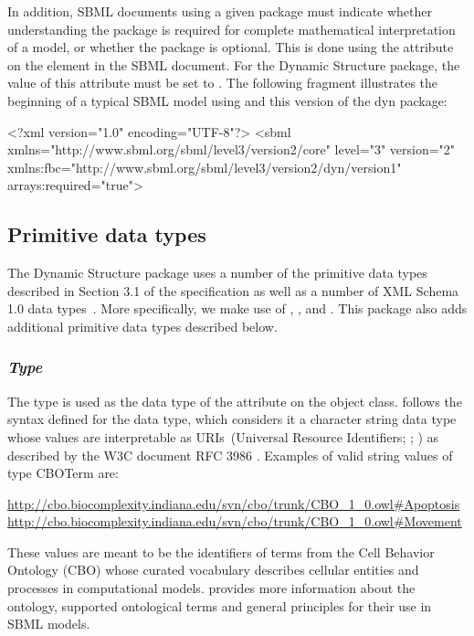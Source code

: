 \begin{center}
\end{center}

In addition, SBML documents using a given package must indicate whether
understanding the package is required for complete mathematical
interpretation of a model, or whether the package is optional.  This is
done using the attribute  on the  element in
the SBML document.  For the Dynamic Structure package, the value of
this attribute must be set to .
The following fragment illustrates the beginning of a typical SBML model
using \sbmlthreecore and this version of the dyn package:

\begin{example}
<?xml version="1.0" encoding="UTF-8"?>
<sbml xmlns="http://www.sbml.org/sbml/level3/version2/core" level="3" version="2"
      xmlns:fbc="http://www.sbml.org/sbml/level3/version2/dyn/version1" arrays:required="true">
\end{example}

\subsection{Primitive data types}
\label{subsec:primitives}
The Dynamic Structure package uses a number of the primitive data types described in Section 3.1 of the \sbmlthreecore specification as well as a number of XML Schema 1.0 data types~\citep{biron:2000}. More specifically, we make use of , , and . This package also adds additional primitive data types described below.

\subsubsection{\emph{Type} }
\label{dat:CBOTerm}

The type  is used as the data type of the attribute  on the \Event object class.  follows the syntax defined for the  data type, which considers it a character string data type whose values are interpretable as URIs~(Universal Resource Identifiers; \citep{Means:2001}; \citep{w3c:2000b}) as described by the W3C document RFC 3986 \citep{Berners-Lee:2005}. Examples of valid string values of type CBOTerm are:  
\begin{center}
\url{http://cbo.biocomplexity.indiana.edu/svn/cbo/trunk/CBO_1_0.owl#Apoptosis} \url{http://cbo.biocomplexity.indiana.edu/svn/cbo/trunk/CBO_1_0.owl#Movement}
\end{center}
These values are meant to be the identifiers of terms from the Cell Behavior Ontology (CBO) whose curated vocabulary describes cellular entities and processes in computational models.  provides more information about the ontology, supported ontological terms and general principles for their use in SBML models.

